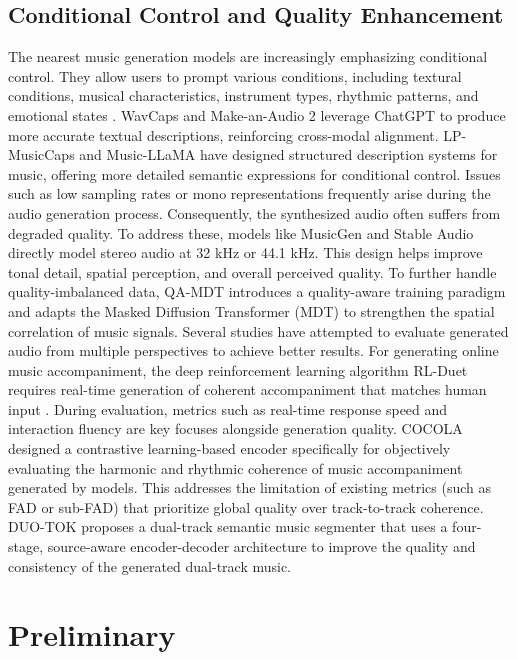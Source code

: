 \documentclass[lettersize,journal]{IEEEtran}
\begin{document}
\subsection{Conditional Control and Quality Enhancement }
The nearest music generation models are increasingly emphasizing conditional control. They allow users to prompt various conditions, including textural conditions, musical characteristics, instrument types, rhythmic patterns, and emotional states \cite{mitra2025music}.  WavCaps \cite {mei2024wavcaps} and Make-an-Audio 2 \cite {huang2023make} leverage ChatGPT \cite {achiam2023gpt} to produce more accurate textual descriptions, reinforcing cross-modal alignment. LP-MusicCaps \cite {doh2023lp} and Music-LLaMA \cite {liu2024music} have designed structured description systems for music, offering more detailed semantic expressions for conditional control. 
Issues such as low sampling rates or mono representations frequently arise during the audio generation process. Consequently, the synthesized audio often suffers from degraded quality. To address these, models like MusicGen and Stable Audio \cite{evans2025stable} directly model stereo audio at 32 kHz or 44.1 kHz. This design helps improve tonal detail, spatial perception, and overall perceived quality. To further handle quality-imbalanced data, QA-MDT \cite{li2024quality} introduces a quality-aware training paradigm and adapts the Masked Diffusion Transformer (MDT) to strengthen the spatial correlation of music signals. Several studies have attempted to evaluate generated audio from multiple perspectives to achieve better results. For generating online music accompaniment, the deep reinforcement learning algorithm RL-Duet \cite{jiang2020rl} requires real-time generation of coherent accompaniment that matches human input \cite{wu2025streaming}. During evaluation, metrics such as real-time response speed and interaction fluency are key focuses alongside generation quality. COCOLA \cite {ciranni2025cocola} designed a contrastive learning-based encoder specifically for objectively evaluating the harmonic and rhythmic coherence of music accompaniment generated by models. This addresses the limitation of existing metrics (such as FAD or sub-FAD) that prioritize global quality over track-to-track coherence. DUO-TOK \cite{lin2025duo} proposes a dual-track semantic music segmenter that uses a four-stage, source-aware encoder-decoder architecture to improve the quality and consistency of the generated dual-track music.

\section{Preliminary}
\end{document}
